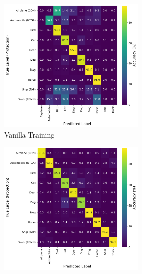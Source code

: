 \documentclass[conference]{IEEEtran}
\theoremstyle{definition}
\theoremstyle{remark}
\theoremstyle{proposition}
\begin{document}
\begin{figure}[p!]
    \begin{subfigure}{1.0\textwidth}
    \centering
        \begin{subfigure}{.40\textwidth}
    		\centering
    		\includegraphics[width=1.0\textwidth]{combination_attacks/ResNet18_CNTR_t_0_confusion_matrix.png}
            \caption*{Vanilla Training}
    	\end{subfigure}
     \hspace{5em}
        \begin{subfigure}{.40\textwidth}
    		\centering
    		\includegraphics[width=1.0\textwidth]{combination_attacks/ResNet18_CNTR_t_200_confusion_matrix.png}

\end{subfigure}
\end{subfigure}
\end{figure}
\end{document}

